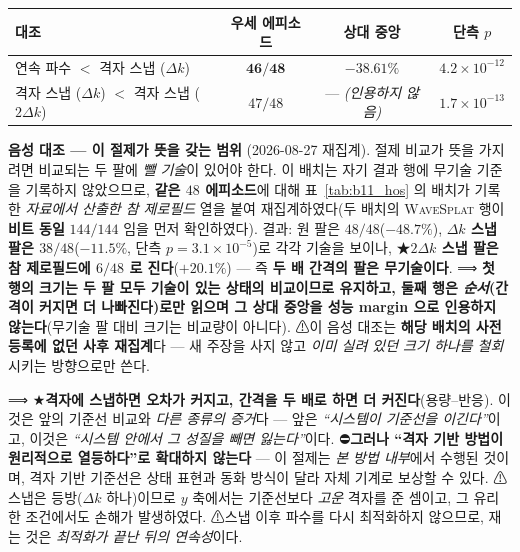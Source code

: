 \documentclass[11pt]{report}
\numberwithin{equation}{chapter}
\numberwithin{figure}{chapter}
\numberwithin{table}{chapter}
\newcommand{\WS}{\textsc{WaveSplat}}
\begin{document}
\begin{center}
\begin{tabular}{lccc}
\toprule
대조 & 우세 에피소드 & 상대 중앙 & 단측 $p$ \\
\midrule
연속 파수 $<$ 격자 스냅 ($\Delta k$) & $\mathbf{46/48}$ & $\mathbf{-38.61\%}$ & $4.2\times10^{-12}$ \\
격자 스냅 ($\Delta k$) $<$ 격자 스냅 ($2\Delta k$) & $47/48$ & --- \emph{(인용하지 않음)} & $1.7\times10^{-13}$ \\
\bottomrule
\end{tabular}
\end{center}

\textbf{음성 대조 --- 이 절제가 뜻을 갖는 범위} (2026-08-27 재집계).
절제 비교가 뜻을 가지려면 비교되는 두 팔에 \emph{뺄 기술}이 있어야 한다. 이 배치는
자기 결과 행에 무기술 기준을 기록하지 않았으므로, \textbf{같은 $48$ 에피소드}에 대해
표~\ref{tab:b11_hos} 의 배치가 기록한 \emph{자료에서 산출한 참 제로필드} 열을 붙여
재집계하였다(두 배치의 \WS{} 행이 \textbf{비트 동일} $144/144$ 임을 먼저 확인하였다).
결과: 원 팔은 $48/48$($-48.7\%$), \textbf{$\Delta k$ 스냅 팔은 $38/48$}($-11.5\%$,
단측 $p = 3.1\times10^{-5}$)로 각각 기술을 보이나, ★\textbf{$2\Delta k$ 스냅 팔은 참
제로필드에 $6/48$ 로 진다}($+20.1\%$) --- 즉 \textbf{두 배 간격의 팔은 무기술이다}.
⟹ \textbf{첫 행의 크기는 두 팔 모두 기술이 있는 상태의 비교이므로 유지하고, 둘째 행은
\emph{순서}(간격이 커지면 더 나빠진다)로만 읽으며 그 상대 중앙을 성능 margin 으로
인용하지 않는다}(무기술 팔 대비 크기는 비교량이 아니다). ⚠이 음성 대조는
\textbf{해당 배치의 사전등록에 없던 사후 재집계}다 --- 새 주장을 사지 않고
\emph{이미 실려 있던 크기 하나를 철회}시키는 방향으로만 쓴다.

⟹ ★\textbf{격자에 스냅하면 오차가 커지고, 간격을 두 배로 하면 더 커진다}(용량--반응).
이것은 앞의 기준선 비교와 \emph{다른 종류의 증거}다 --- 앞은 \emph{``시스템이 기준선을
이긴다''}이고, 이것은 \emph{``시스템 안에서 그 성질을 빼면 잃는다''}이다.
⛔\textbf{그러나 ``격자 기반 방법이 원리적으로 열등하다''로 확대하지 않는다} ---
이 절제는 \emph{본 방법 내부}에서 수행된 것이며, 격자 기반 기준선은 상태 표현과 동화 방식이
달라 자체 기계로 보상할 수 있다. ⚠스냅은 등방($\Delta k$ 하나)이므로 $y$ 축에서는 기준선보다
\emph{고운} 격자를 준 셈이고, 그 유리한 조건에서도 손해가 발생하였다.
⚠스냅 이후 파수를 다시 최적화하지 않으므로, 재는 것은 \emph{최적화가 끝난 뒤의 연속성}이다.
\end{document}
